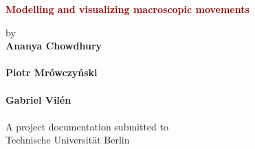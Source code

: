 \begin{titlepage}
	\strut
	\hfill
	\begin{center}
	\vspace{1cm}
		\Huge
		\begin{spacing}{.9}
			\textcolor{DarkRed}{\textbf{Modelling and visualizing macroscopic movements}}\\
		\end{spacing}
		\vspace{0.8cm}
		\large
		by\\
		\vspace{0.8cm}
		\textbf{Ananya Chowdhury}\\
		\\
		\vspace{0.4cm}
		\textbf{Piotr Mrówczyński}\\
		\\
		\vspace{0.4cm}
		\textbf{Gabriel Vilén}\\
		\\
		\vspace{2cm}
	 	A project documentation submitted to\\
		\vspace{0.5cm}
		Technische Universität Berlin\\

\end{center}
\end{titlepage}
